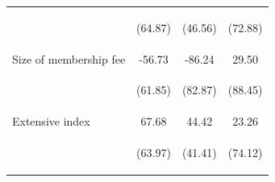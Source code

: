 \documentclass[11pt]{article}
\begin{document}
\begin{table}[H]
{\begin{tabularx}{1.1\linewidth}{lccc}
 & \begin{footnotesize}(64.87)\end{footnotesize} & \begin{footnotesize}(46.56)\end{footnotesize} & \begin{footnotesize}(72.88)\end{footnotesize}\\
\noalign{\smallskip}Size of membership fee & -56.73 & -86.24 & 29.50\\
 & \begin{footnotesize}(61.85)\end{footnotesize} & \begin{footnotesize}(82.87)\end{footnotesize} & \begin{footnotesize}(88.45)\end{footnotesize}\\
\noalign{\smallskip}Extensive index & 67.68 & 44.42 & 23.26\\
 & \begin{footnotesize}(63.97)\end{footnotesize} & \begin{footnotesize}(41.41)\end{footnotesize} & \begin{footnotesize}(74.12)\end{footnotesize}\\


\end{tabularx}}
\end{table}
\end{document}
